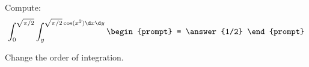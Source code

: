 \documentclass{ximera}
\author{Bart Snapp}
\begin{document}
\begin{exercise}
  Compute:
  \[
  \int_0^{\sqrt{\pi/2}}\int_y^{\sqrt{\pi/2} \cos(x^2) \d x \d y}
  \begin{prompt}
    = \answer{1/2}
  \end{prompt}
  \]
  \begin{hint}
    Change the order of integration.
  \end{hint}
\end{exercise}
\end{document}
